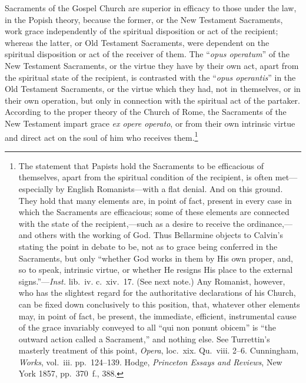 \documentclass[
  english,
]{book}
\providecommand{\textlatin}{}
\renewcommand{\textlatin}[2][]{\foreignlanguage{latin}{#2}}
\begin{document}
Sacraments of the Gospel Church are superior in efficacy to those under the law, in the Popish theory, because the former, or the New Testament Sacraments, work grace independently of the spiritual disposition or act of the recipient; whereas the latter, or Old Testament Sacraments, were dependent on the spiritual disposition or act of the receiver of them. The ``\textlatin{\emph{opus operatum}}'' of the New Testament Sacraments, or the virtue they have by their own act, apart from the spiritual state of the recipient, is contrasted with the ``\textlatin{\emph{opus operantis}}'' in the Old Testament Sacraments, or the virtue which they had, not in themselves, or in their own operation, but only in connection with the spiritual act of the partaker. According to the proper theory of the Church of Rome, the Sacraments of the New Testament impart grace \textlatin{\emph{ex opere operato}}, or from their own intrinsic virtue and direct act on the soul of him who receives them.\footnote{The statement that Papists hold the Sacraments to be efficacious of themselves, apart from the spiritual condition of the recipient, is often met---especially by English Romanists---with a flat denial. And on this ground. They hold that many elements are, in point of fact, present in every case in which the Sacraments are efficacious; some of these elements are connected with the state of the recipient,---such as a desire to receive the ordinance,---and others with the working of God. Thus Bellarmine objects to Calvin's stating the point in debate to be, not as to grace being conferred in the Sacraments, but only ``whether God works in them by His own proper, and, so to speak, intrinsic virtue, or whether He resigns His place to the external signs.''---\emph{Inst.} lib.~iv. c.~xiv.~17. (See next note.) Any Romanist, however, who has the slightest regard for the authoritative declarations of his Church, can be fixed down conclusively to this position, that, whatever other elements may, in point of fact, be present, the immediate, efficient, instrumental cause of the grace invariably conveyed to all ``\textlatin{qui non ponunt obicem}'' is ``the outward action called a Sacrament,'' and nothing else. See Turrettin's masterly treatment of this point, \textlatin{\emph{Opera}}, loc.~xix. Qu.~viii. 2--6. Cunningham, \emph{Works}, vol.~iii. pp.~124--139. Hodge, \emph{Princeton Essays and Reviews}, New York 1857, pp.~370~f., 388.}
\end{document}
